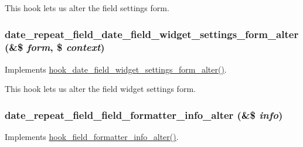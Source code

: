 This hook lets us alter the field settings form. \hypertarget{date__repeat__field_8module_a87cc72264b877be64aac471b62e09eb3}{
\subsubsection[{date\_\-repeat\_\-field\_\-date\_\-field\_\-widget\_\-settings\_\-form\_\-alter}]{\setlength{\rightskip}{0pt plus 5cm}date\_\-repeat\_\-field\_\-date\_\-field\_\-widget\_\-settings\_\-form\_\-alter (\&\$ {\em form}, \/  \$ {\em context})}}
\label{date__repeat__field_8module_a87cc72264b877be64aac471b62e09eb3}
Implements \hyperlink{date_8api_8php_a0c2475c846f8750a83b95ea852bf42cf}{hook\_\-date\_\-field\_\-widget\_\-settings\_\-form\_\-alter()}.

This hook lets us alter the field widget settings form. \hypertarget{date__repeat__field_8module_a38a52391b8d04182e8525017a79b6c5e}{
\subsubsection[{date\_\-repeat\_\-field\_\-field\_\-formatter\_\-info\_\-alter}]{\setlength{\rightskip}{0pt plus 5cm}date\_\-repeat\_\-field\_\-field\_\-formatter\_\-info\_\-alter (\&\$ {\em info})}}
\label{date__repeat__field_8module_a38a52391b8d04182e8525017a79b6c5e}
Implements \hyperlink{group__field__formatter_ga42c57fcac0e7a09f757983224136a850}{hook\_\-field\_\-formatter\_\-info\_\-alter()}.

